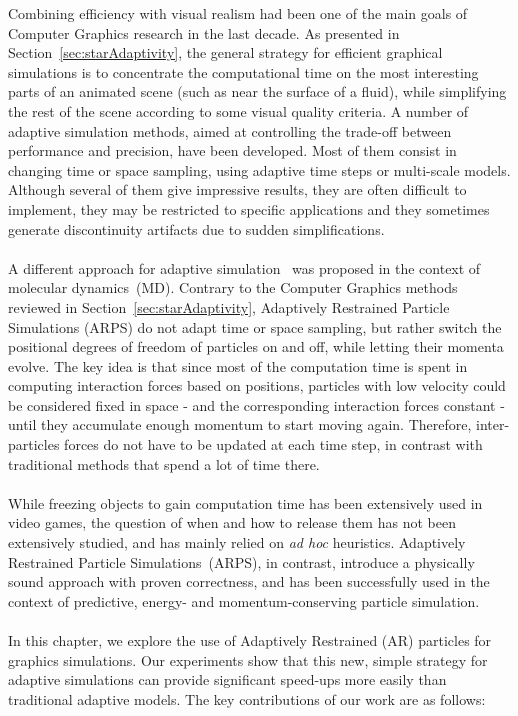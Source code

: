 Combining efficiency with visual realism had been one of the main goals of Computer Graphics research in the last decade. As presented in Section~\ref{sec:starAdaptivity}, the general strategy for efficient graphical simulations is to concentrate the computational time on the most interesting parts of an animated scene (such as near the surface of a fluid), while simplifying the rest of the scene according to some visual quality criteria.  A number of adaptive simulation methods, aimed at controlling the trade-off between performance and precision, have been developed. Most of them consist in changing time or space sampling, using adaptive time steps or multi-scale models.
Although several of them give impressive results, they are often difficult to implement, they may be restricted to specific applications and they sometimes generate discontinuity artifacts due to sudden simplifications.
\\ \\
A different approach for adaptive simulation~\cite{Artemova2012} was proposed in the context of molecular dynamics~(MD). Contrary to the Computer Graphics methods reviewed in Section~\ref{sec:starAdaptivity}, Adaptively Restrained Particle Simulations (ARPS) do not adapt time or space sampling, but rather switch the positional degrees of freedom of particles on and off, while letting their momenta evolve. The key idea is that since most of the computation time is spent in computing interaction forces based on positions, particles with low velocity could be considered fixed in space - and the corresponding interaction forces constant - until they accumulate enough momentum to start moving again. Therefore, inter-particles forces do not have to be updated at each time step, in contrast with traditional methods that spend a lot of time there.
\\ \\
While freezing objects to gain computation time has been extensively used in video games, the question of when and how to release them has not been extensively studied, and has mainly relied on \textit{ad hoc} heuristics.
Adaptively Restrained Particle Simulations~(ARPS), in contrast, introduce a physically sound approach with proven correctness, and has been successfully used in the context of predictive, energy- and momentum-conserving particle simulation.
\\ \\
In this chapter, we explore the use of Adaptively Restrained (AR) particles for graphics simulations. Our experiments show that this new, simple strategy for adaptive simulations can provide significant speed-ups more easily than traditional adaptive models. The key contributions of our work are as follows: 
